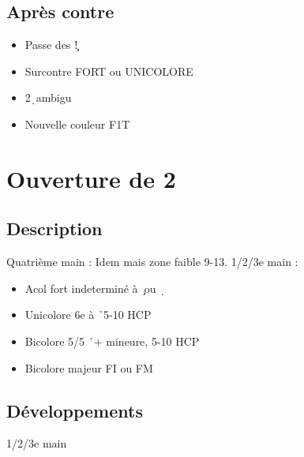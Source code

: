 \documentclass[a4paper]{article}
\begin{document}
\subsection{Après contre}

\begin{itemize}
\item Passe des \c !

\item Surcontre FORT ou UNICOLORE

\item 2\d\ ambigu

\item Nouvelle couleur F1T

\end{itemize}

\section{Ouverture de 2\pdfd}

\subsection{Description}

Quatrième main : Idem mais zone faible 9-13.
1/2/3e main :

\begin{itemize}
\item Acol fort indeterminé à \c\ ou \d\ 

\item Unicolore 6e à \h\ 5-10 HCP 

\item Bicolore 5/5 \h\ + mineure, 5-10 HCP

\item Bicolore majeur FI ou FM

\end{itemize}

\subsection{Développements}

1/2/3e main
\end{document}

